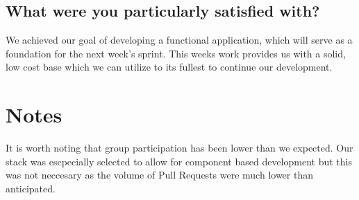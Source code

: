 \documentclass[12pt]{article}
\begin{document}
\subsection{What were you particularly satisfied with?}
We achieved our goal of developing a functional application, which will serve as a foundation for the next week's sprint. 
This weeks work provides us with a solid, low cost base which we can utilize to its fullest to continue our development.

\section{Notes}
It is worth noting that group participation has been lower than we expected.
Our stack was escpecially selected to allow for component based development but this was not neccesary
as the volume of Pull Requests were much lower than anticipated.

\pagebreak
\printbibliography
\end{document}

